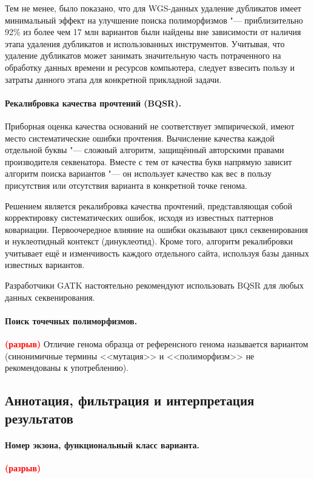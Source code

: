\documentclass[a4paper,12pt]{article}
\newcommand{\spacing}{\textcolor{red}{\textbf{(разрыв)}}}
\begin{document}
Тем не менее, было показано, что для WGS-данных удаление дубликатов имеет минимальный эффект на улучшение поиска полиморфизмов "--- приблизительно 92\% из более чем 17 млн вариантов были найдены вне зависимости от наличия этапа удаления дубликатов и использованных инструментов\cite{ebbert}.
Учитывая, что удаление дубликатов может занимать значительную часть потраченного на обработку данных времени и ресурсов компьютера, следует взвесить пользу и затраты данного этапа для конкретной прикладной задачи.

\paragraph{Рекалибровка качества прочтений (BQSR).}
Приборная оценка качества оснований не соответствует эмпирической, имеют место систематические ошибки прочтения.
Вычисление качества каждой отдельной буквы "--- сложный алгоритм, защищённый авторскими правами производителя секвенатора.
Вместе с тем от качества букв напрямую зависит алгоритм поиска вариантов "--- он использует качество как вес в пользу присутствия или отсутствия варианта в конкретной точке генома.

Решением является рекалибровка качества прочтений, представляющая собой корректировку систематических ошибок, исходя из известных паттернов ковариации.
Первоочередное влияние на ошибки оказывают цикл секвенирования и нуклеотидный контекст (динуклеотид).
Кроме того, алгоритм рекалибровки учитывает ещё и изменчивость каждого отдельного сайта, используя базы данных известных вариантов.

Разработчики GATK настоятельно рекомендуют использовать BQSR для любых данных секвенирования\cite{gatk}.

\paragraph{Поиск точечных полиморфизмов.}
\spacing
Отличие генома образца от референсного генома называется вариантом (синонимичные термины <<мутация>> и <<полиморфизм>> не рекомендованы к употреблению\cite{richards}).

\subsection{Аннотация, фильтрация и интерпретация результатов}

\paragraph{Номер экзона, функциональный класс варианта.}
\spacing
\end{document}
